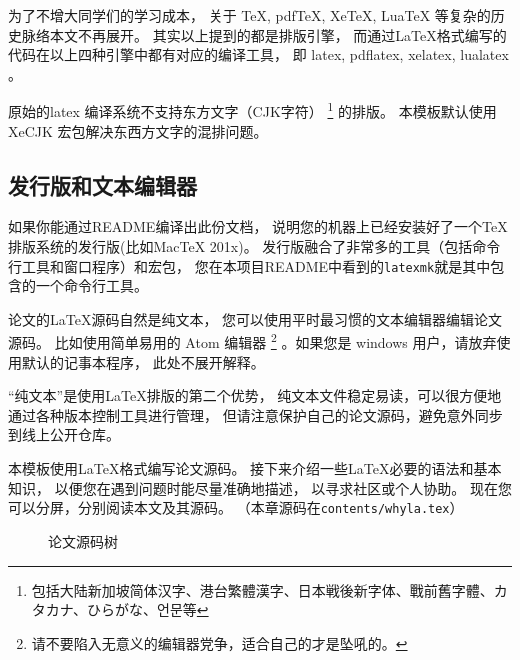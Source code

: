 为了不增大同学们的学习成本，
关于 TeX, pdfTeX,  XeTeX,  LuaTeX 等复杂的历史脉络本文不再展开。
其实以上提到的都是排版引擎，
而通过\LaTeX 格式编写的代码在以上四种引擎中都有对应的编译工具，
即 latex, pdflatex, xelatex, lualatex 。

原始的latex 编译系统不支持东方文字（CJK字符）
\footnote{包括大陆新加坡简体汉字、港台繁體漢字、日本戦後新字体、戰前舊字體、カタカナ、ひらがな、언문等}
的排版。
本模板默认使用XeCJK 宏包解决东西方文字的混排问题。

\subsection{发行版和文本编辑器}
如果你能通过README编译出此份文档，
说明您的机器上已经安装好了一个\TeX 排版系统的发行版(比如MacTeX 201x)。
发行版融合了非常多的工具（包括命令行工具和窗口程序）和宏包，
您在本项目README中看到的\texttt{latexmk}就是其中包含的一个命令行工具。


论文的\LaTeX 源码自然是纯文本，
您可以使用平时最习惯的文本编辑器编辑论文源码。
比如使用简单易用的 Atom 编辑器
\footnote{请不要陷入无意义的编辑器党争，适合自己的才是坠吼的。} %
。如果您是 windows 用户，请放弃使用默认的记事本程序，
此处不展开解释。

“纯文本”是使用\LaTeX 排版的第二个优势，
纯文本文件稳定易读，可以很方便地通过各种版本控制工具进行管理，
但请注意保护自己的论文源码，避免意外同步到线上公开仓库。

本模板使用\LaTeX 格式编写论文源码。
\label{dirtree}
接下来介绍一些\LaTeX 必要的语法和基本知识，
以便您在遇到问题时能尽量准确地描述，
以寻求社区或个人协助。
现在您可以分屏，分别阅读本文及其源码。
（本章源码在\texttt{contents/whyla.tex}）


\begin{figure}[htbp]
    \centering
    \caption{论文源码树}
\end{figure}

